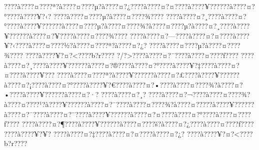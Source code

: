 \documentclass[11pt, openany]{book}
\begin{document}
???\textbar{}?à???\textbar{}?¤???\textbar{}?ª?à???\textbar{}?¤???\textbar{}?µ?à???\textbar{}?¤?¿???\textbar{}?à???\textbar{}?¤?¤???\textbar{}?à???\textbar{}?¥?????\textbar{}?à???\textbar{}?¤?°???\textbar{}?à???\textbar{}?¥?‹?
???\textbar{}?à???\textbar{}?¤???\textbar{}?µ?à???\textbar{}?¤???\textbar{}?¾???\textbar{}?
???\textbar{}?à???\textbar{}?¤?¸???\textbar{}?à???\textbar{}?¤?°???\textbar{}?à???\textbar{}?¥?????\textbar{}?à???\textbar{}?¤???\textbar{}?µ?à???\textbar{}?¤???\textbar{}?¾?à???\textbar{}?¤???\textbar{}?µ?à???\textbar{}?¤?¸???\textbar{}?à???\textbar{}?¥?????\textbar{}?à???\textbar{}?¤?¥???\textbar{}?à???\textbar{}?¤???\textbar{}?¾???\textbar{}?
???\textbar{}?à???\textbar{}?¤?---???\textbar{}?à???\textbar{}?¤?¤???\textbar{}?à???\textbar{}?¥?‹???\textbar{}?à???\textbar{}?¤???\textbar{}?½?à???\textbar{}?¤???\textbar{}?ª?à???\textbar{}?¤?¿?
???\textbar{}?à???\textbar{}?¤???\textbar{}?µ?à???\textbar{}?¤???\textbar{}?¾???\textbar{}?
???\textbar{}?à???\textbar{}?¥?¤?\textless{}???\textbar{}?b?r???\textbar{}?
?/?\textgreater{}???\textbar{}?à???\textbar{}?¤?¯???\textbar{}?à???\textbar{}?¤???\textbar{}?ƒ???\textbar{}?
???\textbar{}?à???\textbar{}?¤?¸???\textbar{}?à???\textbar{}?¥?????\textbar{}?à???\textbar{}?¤?®???\textbar{}?à???\textbar{}?¤?°???\textbar{}?à???\textbar{}?¥?‡???\textbar{}?à???\textbar{}?¤?¤???\textbar{}?à???\textbar{}?¥???
???\textbar{}?à???\textbar{}?¤???\textbar{}?ª?à???\textbar{}?¥?????\textbar{}?à???\textbar{}?¤?£???\textbar{}?à???\textbar{}?¥?????\textbar{}?à???\textbar{}?¤?¡???\textbar{}?à???\textbar{}?¤?°???\textbar{}?à???\textbar{}?¥?€???\textbar{}?à???\textbar{}?¤?•???\textbar{}?à???\textbar{}?¤???\textbar{}?¾?à???\textbar{}?¤?•???\textbar{}?à???\textbar{}?¥?????\textbar{}?à???\textbar{}?¤?·?
???\textbar{}?à???\textbar{}?¤?¸?
???\textbar{}?à???\textbar{}?¤?¬???\textbar{}?à???\textbar{}?¤???\textbar{}?¾?à???\textbar{}?¤???\textbar{}?¹?à???\textbar{}?¥?????\textbar{}?à???\textbar{}?¤?¯???\textbar{}?à???\textbar{}?¤???\textbar{}?¾?à???\textbar{}?¤?­???\textbar{}?à???\textbar{}?¥?????\textbar{}?à???\textbar{}?¤?¯???\textbar{}?à???\textbar{}?¤?¨???\textbar{}?à???\textbar{}?¥?????\textbar{}?à???\textbar{}?¤?¤???\textbar{}?à???\textbar{}?¤?°???\textbar{}?à???\textbar{}?¤???\textbar{}?ƒ???\textbar{}?
???\textbar{}?à???\textbar{}?¤?¶???\textbar{}?à???\textbar{}?¥?????\textbar{}?à???\textbar{}?¤???\textbar{}?š?à???\textbar{}?¤?¿???\textbar{}?à???\textbar{}?¤???\textbar{}?ƒ???\textbar{}?
???\textbar{}?à???\textbar{}?¥?¥?
???\textbar{}?à???\textbar{}?¤?‡???\textbar{}?à???\textbar{}?¤?¤???\textbar{}?à???\textbar{}?¤?¿?
???\textbar{}?à???\textbar{}?¥?¤?\textless{}???\textbar{}?b?r???\textbar{}?
\end{document}
